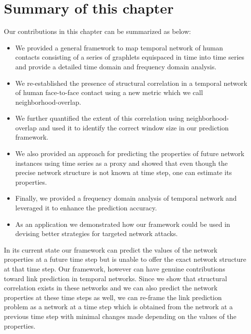 \noindent
\section{Summary of this chapter}
\label{conclusion}

Our contributions in this chapter can be summarized as below:
\begin{itemize}

\item We provided a general framework to map temporal network of human contacts consisting of a series of graphlets equispaced in time into time series
and provide a detailed time domain and frequency domain analysis.

\item We re-established the presence of structural correlation in a temporal network of human face-to-face contact using a new metric which we call
neighborhood-overlap.

\item We further quantified the extent of this correlation using neighborhood-overlap and used it to identify the correct window size in our prediction framework.

\item We also provided an approach for predicting the properties of future network instances using time series as a proxy and showed that even though the 
precise network structure is not known at time step, one can estimate its properties.

\item Finally, we provided a frequency domain analysis of temporal network and leveraged it to enhance the prediction accuracy.

\item As an application we demonstrated how our framework could be used in devising better strategies for targeted network attacks.
 
 \end{itemize}
 
 In its current state our framework can predict the values of the network properties at a future time step but is unable to offer the exact network 
 structure at that time step. Our framework, however can have genuine contributions toward link prediction in temporal networks. Since we show that structural 
 correlation exists in these networks and we can also predict the network properties at these time steps as well, we can re-frame the link prediction problem 
 as a network at a time step which is obtained from the network at a previous time step with minimal changes made depending on the values of the properties. 


\medskip